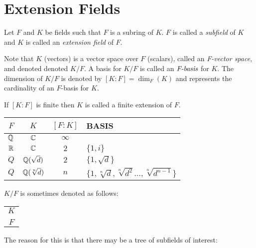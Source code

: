 \documentclass[letterpaper,12pt,fleqn]{article}
\begin{document}
\section*{Extension Fields}

\begin{definition}
  Let $F$ and $K$ be fields such that $F$ is a subring of $K$. $F$ is called a
  \emph{subfield} of $K$ and $K$ is called an \emph{extension field} of $F$.

  Note that $K$ (vectors) is a vector space over $F$ (scalars), called an
  \emph{F-vector space}, and denoted denoted $K/F$. A basis for $K/F$ is called an
  $\emph{F-basis}$ for $K$. The dimension of $K/F$ is denoted by $[K:F]=\dim_F(K)$ and
  represents the cardinality of an $F$-basis for $K$.

  If $[K:F]$ is finite then $K$ is called a finite extension of $F$.
\end{definition}

\begin{example}
  \begin{tabular}{cccl}
    $F$ & $K$ & $[F:K]$ & BASIS \\
    \hline
    $\mathbb{Q}$ & $\mathbb{C}$ & $\infty$ \\
    $\mathbb{R}$ & $\mathbb{C}$ & $2$ & $\{1,i\}$ \\
    $Q$ & $\mathbb{Q}(\sqrt{d})$ & $2$ & $\{1,\sqrt{d}\}$ \\
    $Q$ & $\mathbb{Q}(\sqrt[n]{d})$ & $n$ &
    $\{1,\sqrt[n]{d},\sqrt[n]{d^2}\ldots,\sqrt[n]{d^{n-1}}\}$
  \end{tabular}
\end{example}

\begin{notation}
  $K/F$ is sometimes denoted as follows:

  \begin{table}[h]
    \setlength{\leftskip}{1in}
    \begin{tabular}{c}
      $K$ \\
      \vline \\
      $F$
    \end{tabular}
  \end{table}

  The reason for this is that there may be a tree of subfields of interest:

  \begin{figure}[h]
    \setlength{\leftskip}{1in}
  \end{figure}
\end{notation}
\end{document}
